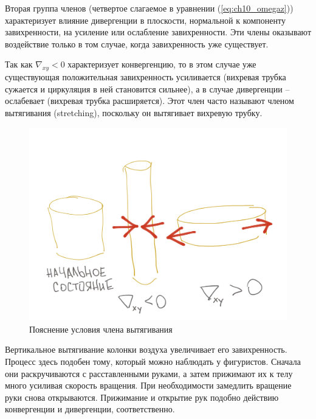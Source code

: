 Вторая группа членов (четвертое слагаемое в уравнении (\ref{eq:ch10_omegaz})) характеризует влияние дивергенции в плоскости, нормальной к компоненту завихренности, на усиление или ослабление завихренности. Эти члены оказывают воздействие только в том случае, когда завихренность уже существует. 

Так как $\nabla_{xy}<0$ характеризует конвергенцию, то в этом случае уже существующая положительная завихренность усиливается (вихревая трубка сужается и циркуляция в ней становится сильнее), а в случае дивергенции -- ослабевает (вихревая трубка расширяется). Этот член часто называют членом вытягивания (stretching), поскольку он вытягивает вихревую трубку. 
    \begin{figure}[h]
    \centering
    \includegraphics[width=0.5\linewidth]{pics/ch10.2.png}
    \caption{\label{fig:ch10.2}
    Пояснение условия члена вытягивания
    }
    \end{figure}    
Вертикальное вытягивание колонки воздуха увеличивает его завихренность. Процесс здесь подобен тому, который можно наблюдать у фигуристов. Сначала они раскручиваются с расставленными руками, а затем прижимают их к телу много усиливая скорость вращения. При необходимости замедлить вращение руки снова открываются. Прижимание и открытие рук подобно действию конвергенции и дивергенции, соответственно. 

